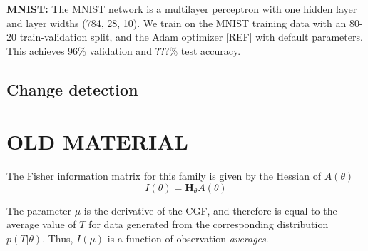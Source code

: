 \documentclass[11pt]{article}      %
\begin{document}
\noindent \textbf{MNIST:} The MNIST network is a multilayer perceptron with one hidden layer and layer widths (784, 28, 10).
We train on the MNIST training data with an 80-20 train-validation split, and the Adam optimizer [REF] with default parameters.
This achieves 96\% validation and ???\% test accuracy.



\subsection{Change detection}



\section{OLD MATERIAL}

The Fisher information matrix for this family is given by the Hessian of $A(\theta)$ 
\begin{equation}
  I(\theta) = \bm{H}_\theta A(\theta) 
\end{equation}

The parameter $\mu$ is the derivative of the CGF, and therefore is equal to the average value of $T$ for data generated from the corresponding distribution $p(T|\theta)$.
Thus, $I(\mu)$ is a function of observation \textit{averages}.




\end{document}
